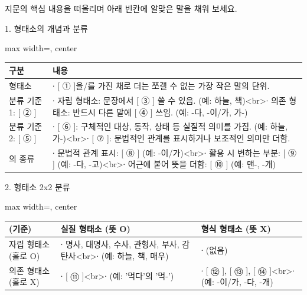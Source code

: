 \documentclass[fs9,seriesRus]{korfarm-base}
\begin{document}
\kfActivityBg \par{}지문의 핵심 내용을 떠올리며 아래 빈칸에 알맞은 말을 채워 보세요.

1. 형태소의 개념과 분류 

\par\medskip{}
\noindent\begin{adjustbox}{max width=\linewidth, center}
\renewcommand{\arraystretch}{1.45}
\begin{tabular}{|>{\raggedright\arraybackslash}p{}|>{\raggedright\arraybackslash}p{}|}
\hline
\rowcolor{kfPrimaryLight!50}\textbf{\color{kfPrimary} 구분} & \textbf{\color{kfPrimary} 내용} \\\hline
형태소 & ∙ [ ① ]을/를 가진 채로 더는 쪼갤 수 없는 가장 작은 말의 단위. \\\hline
분류 기준 1: [ ② ] & ∙ 자립 형태소: 문장에서 [ ③ ] 쓸 수 있음. (예: 하늘, 책)<br>∙ 의존 형태소: 반드시 다른 말에 [ ④ ] 쓰임. (예: -다, -이/가, 가-) \\\hline
분류 기준 2: [ ⑤ ] & ∙ [ ⑥ ]: 구체적인 대상, 동작, 상태 등 실질적 의미를 가짐. (예: 하늘, 가-)<br>∙ [ ⑦ ]: 문법적인 관계를 표시하거나 보조적인 의미만 더함. \\\hline
[ ⑦ ]의 종류 & ∙ 문법적 관계 표시: [ ⑧ ] (예: -이/가)<br>∙ 활용 시 변하는 부분: [ ⑨ ] (예: -다, -고)<br>∙ 어근에 붙어 뜻을 더함: [ ⑩ ] (예: 맨-, -개) \\\hline
\end{tabular}
\end{adjustbox}\par\medskip



2. 형태소 2x2 분류  

\par\medskip{}
\noindent\begin{adjustbox}{max width=\linewidth, center}
\renewcommand{\arraystretch}{1.45}
\begin{tabular}{|>{\raggedright\arraybackslash}p{}|>{\raggedright\arraybackslash}p{}|>{\raggedright\arraybackslash}p{}|}
\hline
\rowcolor{kfPrimaryLight!50}\textbf{\color{kfPrimary} (기준)} & \textbf{\color{kfPrimary} 실질 형태소 (뜻 O)} & \textbf{\color{kfPrimary} 형식 형태소 (뜻 X)} \\\hline
자립 형태소 (홀로 O) & ∙ 명사, 대명사, 수사, 관형사, 부사, 감탄사<br>∙ (예: 하늘, 책, 매우) & ∙ (없음) \\\hline
의존 형태소 (홀로 X) & ∙ [ ⑪ ]<br>∙ (예: '먹다'의 '먹-') & ∙ [ ⑫ ], [ ⑬ ], [ ⑭ ]<br>∙ (예: -이/가, -다, -개) \\\hline
\end{tabular}
\end{adjustbox}\par\medskip
\end{document}
